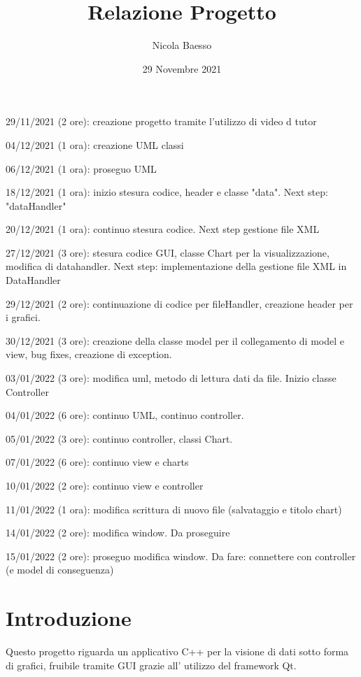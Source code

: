 \documentclass[10pt]{article}
\author{Nicola Baesso}
\title{Relazione Progetto}
\date{29 Novembre 2021}
\begin{document}
	\setlength{\baselineskip}{13 pt}
	
	\maketitle
	
	
	29/11/2021 (2 ore): creazione progetto tramite l'utilizzo di video d tutor
	
	04/12/2021 (1 ora): creazione UML classi
	
	06/12/2021 (1 ora): proseguo UML
	
	18/12/2021 (1 ora): inizio stesura codice, header e classe "data". Next step: "dataHandler"
	
	20/12/2021 (1 ora): continuo stesura codice. Next step gestione file XML
	
	27/12/2021 (3 ore): stesura codice GUI, classe Chart per la visualizzazione, modifica di datahandler. Next step: implementazione della gestione file XML in DataHandler
	
	29/12/2021 (2 ore): continuazione di codice per fileHandler, creazione header per i grafici.
     
    30/12/2021 (3 ore): creazione della classe model per il collegamento di model e view, bug fixes, creazione di exception.
    
    03/01/2022 (3 ore): modifica uml, metodo di lettura dati da file. Inizio classe Controller
    
    04/01/2022 (6 ore): continuo UML, continuo controller.
    
    05/01/2022 (3 ore): continuo controller, classi Chart.
    
    07/01/2022 (6 ore): continuo view e charts
    
    10/01/2022 (2 ore): continuo view e controller
    
    11/01/2022 (1 ora): modifica scrittura di nuovo file (salvataggio e titolo chart)
    
    14/01/2022 (2 ore): modifica window. Da proseguire
    
    15/01/2022 (2 ore): proseguo modifica window. Da fare: connettere con controller (e model di conseguenza)
    
    \newpage
    \tableofcontents
    \newpage
    \section{Introduzione}
     Questo progetto riguarda un applicativo C++ per la visione di dati sotto forma di grafici, fruibile tramite GUI grazie all' utilizzo del framework Qt.
\end{document}
